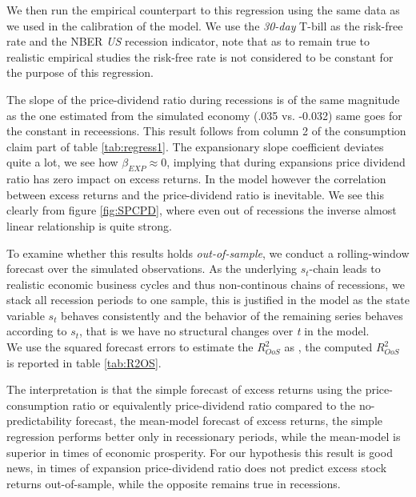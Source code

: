 

We then run the empirical counterpart to this regression using the same data as we used in the calibration of the model. We use the \textit{30-day} T-bill as the risk-free rate and the NBER \textit{US} recession indicator, note that as to remain true to realistic empirical studies the risk-free rate is not considered to be constant for the purpose of this regression. 



The slope of the price-dividend ratio during recessions is of the same magnitude as the one estimated from the simulated economy (.035 vs. -0.032) same goes for the constant in receessions. This result follows from column 2 of the consumption claim part of table \ref{tab:regress1}. The expansionary slope coefficient deviates quite a lot, we see how $\beta_{EXP}\approx 0$, implying that during expansions price dividend ratio has zero impact on excess returns. In the model however the correlation between excess returns and the price-dividend ratio is inevitable. We see this clearly from figure \ref{fig:SPCPD}, where even out of recessions the inverse almost linear relationship is quite strong.


To examine whether this results holds \textit{out-of-sample}, we conduct a rolling-window forecast over the simulated observations. As the underlying $s_t$-chain leads to realistic economic business cycles and thus non-continous chains of recessions, we stack all recession periods to one sample, this is justified in the model as the state variable $s_t$ behaves consistently and the behavior of the remaining series behaves according to $s_t$, that is we have no structural changes over \textit{t} in the model. \\
We use the squared forecast errors to estimate the $R^2_{OoS}$ as \citet{CT2005}, the computed $R^2_{OoS}$ is reported in table \ref{tab:R2OS}. 



The interpretation is that the simple forecast of excess returns using the price-consumption ratio or equivalently price-dividend ratio compared to the no-predictability forecast, the mean-model forecast of excess returns, the simple regression performs better only in recessionary periods, while the mean-model is superior in times of economic prosperity. For our hypothesis this result is good news, in times of expansion price-dividend ratio does not predict excess stock returns out-of-sample, while the opposite remains true in recessions.\\


